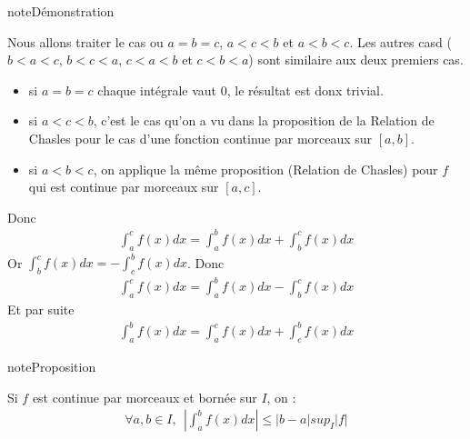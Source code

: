 \documentclass[letterpaper,10pt,french]{sphinxmanual}
\begin{document}
\begin{sphinxadmonition}{note}{Démonstration}

\sphinxAtStartPar
Nous allons traiter le cas ou \(a=b=c\), \(a<c<b\) et \(a<b<c\). Les autres casd (\(b<a<c\), \(b<c<a\), \(c<a<b\) et \(c<b<a\)) sont similaire aux deux premiers cas.
\begin{itemize}
\item {} 
\sphinxAtStartPar
si \(a=b=c\) chaque intégrale vaut 0, le résultat est donx trivial.

\item {} 
\sphinxAtStartPar
si \(a<c<b\), c’est le cas qu’on a vu dans la proposition de la Relation de Chasles pour le cas d’une fonction continue par morceaux sur \([a, b]\).

\item {} 
\sphinxAtStartPar
si \(a<b<c\), on applique la même proposition (Relation de Chasles) pour \(f\) qui est continue par morceaux sur  \([a, c]\).

\end{itemize}

\sphinxAtStartPar
Donc
\begin{equation*}
\begin{split}
\int_a^c f(x)dx = \int_a^b f(x)dx + \int_b^c f(x)dx
\end{split}
\end{equation*}
\sphinxAtStartPar
Or \(\int_b^c f(x)dx = - \int_c^b f(x)dx\). Donc
\begin{equation*}
\begin{split}
\int_a^c f(x)dx = \int_a^b f(x)dx - \int_b^c f(x)dx
\end{split}
\end{equation*}
\sphinxAtStartPar
Et par suite
\begin{equation*}
\begin{split}
\int_a^b f(x)dx = \int_a^c f(x)dx + \int_c^b f(x)dx
\end{split}
\end{equation*}\end{sphinxadmonition}

\begin{sphinxadmonition}{note}{Proposition}

\sphinxAtStartPar
Si \(f\) est continue par morceaux et bornée sur \(I\), on :
\begin{equation*}
\begin{split}
\forall a, b \in I, ~~ \left|\int_a^b f(x)dx\right| \leq |b-a| sup_{I} |f|
\end{split}
\end{equation*}\end{sphinxadmonition}
\end{document}
